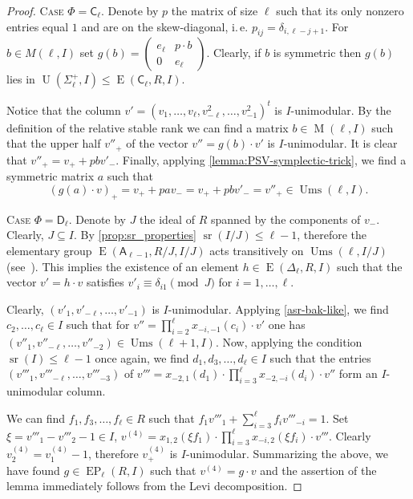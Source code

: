 \documentclass[oneside, 12pt]{amsart}
\theoremstyle{plain}
\numberwithin{equation}{section}
\numberwithin{lemma}{section}
\theoremstyle{definition}
\theoremstyle{remark}
\DeclareMathOperator{\E}{E}
\DeclareMathOperator{\EP}{EP}
\DeclareMathOperator{\U}{U}
\DeclareMathOperator{\M}{M}
\DeclareMathOperator{\sr}{sr}
\DeclareMathOperator{\Ums}{Ums}
\newcommand{\rA}{\mathsf{A}}
\newcommand{\rC}{\mathsf{C}}
\newcommand{\rD}{\mathsf{D}}
\begin{document}
\begin{proof} 
\textsc{Case $\Phi=\rC_\ell$.}
Denote by $p$ the matrix of size $\ell$ such that its only nonzero entries equal $1$ and are on the skew-diagonal, i.\,e. $p_{ij}=\delta_{i, \ell-j+1}$. 
For $b \in M(\ell, I)$ set $g(b)=\left(\begin{smallmatrix} e_\ell & p \cdot b \\ 0 & e_{\ell} \end{smallmatrix}\right)$.
Clearly, if $b$ is symmetric then $g(b)$ lies in $\U(\Sigma_\ell^+, I)\leq \E(\rC_\ell, R, I)$.

Notice that the column $v'=(v_1,\ldots,v_\ell, v_{-\ell}^2,\ldots,v_{-1}^2)^t$ is $I$-unimodular.
By the definition of the relative stable rank we can find a matrix $b\in \M(\ell,I)$ such that the upper half $v''_+$ of the vector $v''= g(b) \cdot v'$ is $I$-unimodular.
It is clear that $v''_+ = v_+ + pb v'_-$. 
Finally, applying \cref{lemma:PSV-symplectic-trick}, we find a symmetric matrix $a$ such that
\[ (g(a)\cdot v)_+=v_+ + pav_- = v_+ + pbv'_- = v''_+ \in \Ums(\ell, I). \]

\textsc{Case $\Phi=\rD_\ell$.} Denote by $J$ the ideal of $R$ spanned by the components of $v_{-}$. Clearly, $J \subseteq I$.
By \cref{prop:sr_properties} $\sr(I/J) \leqslant \ell-1$, therefore
the elementary group $\E(\rA_{\ell-1}, R/J, I/J)$ acts transitively on $\Ums(\ell, I/J)$ (see~\cite[Theorem~2.3c]{Va69}). 
This implies the existence of an element $h\in \E(\Delta_\ell, R, I)$ such that the vector $v' = h \cdot v$ satisfies $v'_i \equiv \delta_{i1} \pmod J$ for $i=1, \ldots, \ell$.

Clearly, $(v'_1, v'_{-\ell}, \ldots, v'_{-1})$ is $I$-unimodular.
Applying \cref{asr-bak-like}, we find $c_2, \ldots, c_\ell\in I$ such that for $v''= \prod_{i=2}^{\ell}x_{-i, -1}(c_i)\cdot v'$ one has
$(v''_1, v''_{-\ell},\ldots, v''_{-2})\in\Ums(\ell+1, I)$.
Now, applying the condition $\sr(I) \leqslant \ell-1$ once again, we find
$d_1, d_3, \ldots, d_{\ell}\in I$ such that the entries $(v'''_1, v'''_{-\ell}, \ldots, v'''_{-3})$
of $v'''=x_{-2, 1}(d_1) \cdot \prod_{i=3}^{\ell} x_{-2, -i}(d_i) \cdot v''$ form an $I$-unimodular column.

We can find $f_1, f_3,\ldots, f_\ell \in R$ such that $f_1v'''_1+\sum_{i=3}^\ell f_i v'''_{-i} = 1$.
Set $\xi = v'''_1-v'''_2-1 \in I$, $v^{(4)}=x_{1,2}(\xi f_1) \cdot \prod_{i=3}^\ell x_{-i,2}(\xi f_i) \cdot v'''$.
Clearly $v^{(4)}_2 = v^{(4)}_1-1$, therefore $v^{(4)}_+$ is $I$-unimodular.
Summarizing the above, we have found $g\in \EP_\ell(R, I)$ such that $v^{(4)}=g \cdot v$
and the assertion of the lemma immediately follows from the Levi decomposition. \end{proof}
\end{document}
